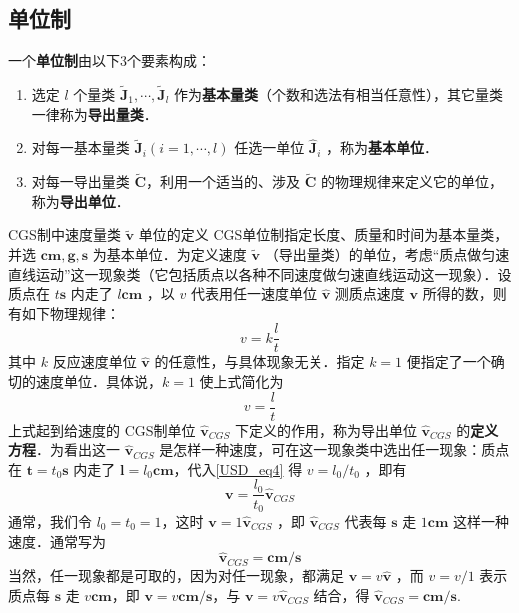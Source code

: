 \subsection{单位制}
一个\textbf{单位制}由以下3个要素构成：
\begin{enumerate}
\item 选定 $l$ 个量类 $\tilde{\boldsymbol{J}}_1,\cdots,\tilde{\boldsymbol{J}}_l$ 作为\textbf{基本量类}（个数和选法有相当任意性），其它量类一律称为\textbf{导出量类}．  
\item 对每一基本量类 $\tilde{\boldsymbol{J}}_i(i=1,\cdots,l)$ 任选一单位 $\hat{\boldsymbol{J}}_i$ ，称为\textbf{基本单位}．
\item 对每一导出量类 $\tilde{\boldsymbol{C}}$，利用一个适当的、涉及 $\tilde{\boldsymbol{C}}$ 的物理规律来定义它的单位，称为\textbf{导出单位}．
\end{enumerate}
\begin{example}{CGS制中速度量类 $\tilde{\boldsymbol{v}
}$ 单位的定义}\label{USD_ex1}
CGS单位制指定长度、质量和时间为基本量类，并选 $\boldsymbol{cm},\boldsymbol{g},\boldsymbol{s}$ 为基本单位．为定义速度 $\tilde{\boldsymbol{v}}$ （导出量类）的单位，考虑“质点做匀速直线运动”这一现象类（它包括质点以各种不同速度做匀速直线运动这一现象）．设质点在 $t\boldsymbol{s}$ 内走了 $l\boldsymbol{cm}$ ，以 $v$ 代表用任一速度单位 $\hat{\boldsymbol{v}}$ 测质点速度 $\boldsymbol{v}$ 所得的数，则有如下物理规律：
\begin{equation}
v=k\frac{l}{t}
\end{equation}
其中 $k$ 反应速度单位 $\hat{\boldsymbol{v}}$ 的任意性，与具体现象无关．指定 $k=1$ 便指定了一个确切的速度单位．具体说，$k=1$ 使上式简化为
\begin{equation}\label{USD_eq4}
v=\frac{l}{t}
\end{equation}
上式起到给速度的 CGS制单位 $\hat{\boldsymbol{v}}_{CGS}$ 下定义的作用，称为导出单位 $\hat{\boldsymbol{v}}_{CGS}$ 的\textbf{定义方程}．为看出这一 $\hat{\boldsymbol{v}}_{CGS}$ 是怎样一种速度，可在这一现象类中选出任一现象：质点在 $\boldsymbol{t}=t_0\boldsymbol{s}$ 内走了 $\boldsymbol{l}=l_0\boldsymbol{cm}$，代入\autoref{USD_eq4} 得 $v=l_0/t_0$ ，即有
\begin{equation}
\boldsymbol{v}=\frac{l_0}{t_0}\hat{\boldsymbol{v}}_{CGS}
\end{equation}
通常，我们令 $l_0=t_0=1$，这时 $\boldsymbol{v}=1\hat{\boldsymbol{v}}_{CGS}$ ，即 $\hat{\boldsymbol{v}}_{CGS}$ 代表每 $\boldsymbol{s}$ 走 $1\boldsymbol{cm}$ 这样一种速度．通常写为
\begin{equation}
\hat{\boldsymbol{v}}_{CGS}=\boldsymbol{cm/s}
\end{equation}
当然，任一现象都是可取的，因为对任一现象，都满足 $\boldsymbol{v}=v\hat{\boldsymbol{v}}$ ，而 $v=v/1$ 表示质点每 $\boldsymbol{s}$ 走 $v\boldsymbol{cm}$，即 $\boldsymbol{v}=v\boldsymbol{cm/s}$，与 $\boldsymbol{v}=v\hat{\boldsymbol{v}}_{CGS}$ 结合，得 $\hat{\boldsymbol{v}}_{CGS}=\boldsymbol{cm/s}$.

\end{example}
